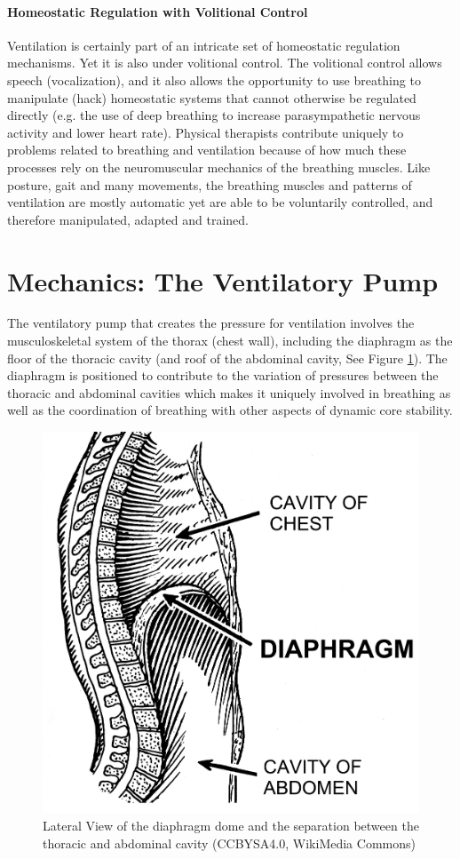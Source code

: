 \paragraph{Homeostatic Regulation with Volitional Control} Ventilation is certainly part of an intricate set of homeostatic regulation mechanisms. Yet it is also under volitional control. The volitional control allows speech (vocalization), and it also allows the opportunity to use breathing to manipulate (hack) homeostatic systems that cannot otherwise be regulated directly (e.g. the use of deep breathing to increase parasympathetic nervous activity and lower heart rate). Physical therapists contribute uniquely to problems related to breathing and ventilation because of how much these processes rely on the neuromuscular mechanics of the breathing muscles. Like posture, gait and many movements, the breathing muscles and patterns of ventilation are mostly automatic yet are able to be voluntarily controlled, and therefore manipulated, adapted and trained.


\section{Mechanics: The Ventilatory Pump}

The ventilatory pump that creates the pressure for ventilation involves the musculoskeletal system of the thorax (chest wall), including the diaphragm as the floor of the thoracic cavity (and roof of the abdominal cavity, See Figure \ref{fig:diaphragm_lateral}). The diaphragm is positioned to contribute to the variation of pressures between the thoracic and abdominal cavities which makes it uniquely involved in breathing as well as the coordination of breathing with other aspects of dynamic core stability. 

\begin{figure}[!h]
    \centering
    \includegraphics[width=0.5 \linewidth]{./figure/diaphragm_lateral.png}
    \caption{Lateral View of the diaphragm dome and the separation between the thoracic and abdominal cavity \footnotesize{(CCBYSA4.0, WikiMedia Commons)}}
    \label{fig:diaphragm_lateral}
\end{figure}

